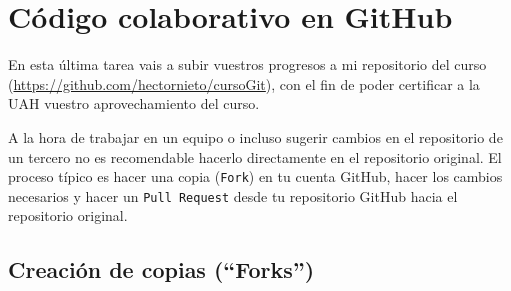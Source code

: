 \documentclass[a5paper, oneside,10pt]{article}
\begin{document}
  \section{Código colaborativo en GitHub}
   En esta última tarea vais a subir vuestros progresos a mi repositorio del curso (\url{https://github.com/hectornieto/cursoGit}), con el fin de poder certificar a la UAH vuestro aprovechamiento del curso.
   
   A la hora de trabajar en un equipo o incluso sugerir cambios en el repositorio de un tercero no es recomendable hacerlo directamente en el repositorio original. El proceso típico es hacer una copia (\verb+Fork+) en tu cuenta GitHub, hacer los cambios necesarios y hacer un \verb+Pull Request+ desde tu repositorio GitHub hacia el repositorio original.
   
   \subsection{Creación de copias (``Forks'')}
\end{document}
